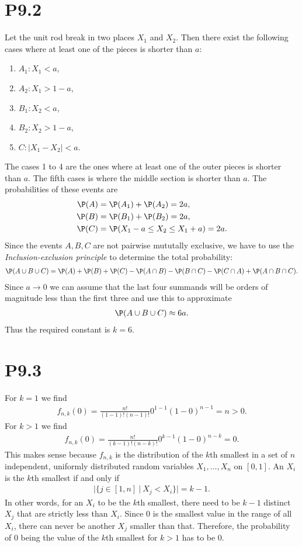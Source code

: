 \documentclass{article}
\begin{document}
\section*{P9.2}

Let the unit rod break in two places $X_1$ and $X_2$. Then there
exist the following cases where at least one of the pieces is shorter
than $a$:
\begin{enumerate}
	\item $A_1:X_1<a$,
	\item $A_2:X_1>1-a$,
	\item $B_1:X_2<a$,
	\item $B_2:X_2>1-a$,
	\item $C:|X_1-X_2|<a$.
\end{enumerate}
The cases 1 to 4 are the ones where at least one of the outer
pieces is shorter than $a$. The fifth cases is where the middle section
is shorter than $a$. The probabilities of these events are
\begin{align*}
	\P(A) & = \P(A_1) + \P(A_2) = 2a,            \\
	\P(B) & = \P(B_1) + \P(B_2) = 2a,            \\
	\P(C) & = \P(X_1-a\leq X_2 \leq X_1+a) = 2a.
\end{align*}
Since the events $A,B,C$ are not pairwise mututally exclusive,
we have to use the \emph{Inclusion-exclusion principle}
to determine the total probability:
\begin{align*}
	\P(A\cup B\cup C) = \P(A) + \P(B) + \P(C) - \P(A \cap B) - \P(B\cap C) - \P(C\cap A) + \P(A\cap B\cap C).
\end{align*}
Since $a\to 0$ we can assume that the last four summands will be
orders of magnitude less than the first three and use this to approximate
\begin{align*}
	\P(A\cup B\cup C) \approx 6a.
\end{align*}
Thus the required constant is $k=6$.

\section*{P9.3}

For $k=1$ we find
\begin{align*}
	f_{n,k}(0) = \frac{n!}{(1-1)!(n-1)!}0^{1-1}(1-0)^{n-1} = n > 0.
\end{align*}
For $k>1$ we find
\begin{align*}
	f_{n,k}(0) = \frac{n!}{(k-1)!(n-k)!}0^{k-1}(1-0)^{n-k} = 0.
\end{align*}
This makes sense because $f_{n,k}$ is the distribution of
the $k$th smallest in a set of $n$ independent, uniformly distributed
random variables $X_1, ..., X_n$ on $[0,1]$.
An $X_i$ is the $k$th smallest if and only if
\begin{align*}
	|\{j \in [1,n]\:|\: X_j < X_i\}| = k-1.
\end{align*} In other words, for an $X_i$ to be
the $k$th smallest, there need to be $k-1$ distinct $X_j$ that are strictly
less than $X_i$. Since $0$ is the smallest value in the range of
all $X_i$, there can never be another $X_j$ smaller than that.
Therefore, the probability of $0$ being the value of the $k$th smallest
for $k>1$ has to be $0$.
\end{document}
